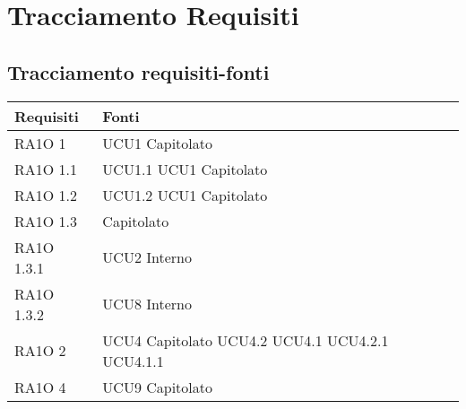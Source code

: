 \section{Tracciamento Requisiti}
\subsection{Tracciamento requisiti-fonti}
      \begin{center}
      \bgroup
      \def\arraystretch{1.8}
      \begin{longtable}{ | p{5cm} | p{5cm} |}
    
      \cellcolor[gray]{0.9} \textbf{Requisiti} & \cellcolor[gray]{0.9} \textbf{Fonti} \\ \hline       
        RA1O 1 &  UCU1 \newline  Capitolato \newline  \\ \hline      
        RA1O 1.1 &  UCU1.1 \newline  UCU1 \newline  Capitolato \newline  \\ \hline      
        RA1O 1.2 &  UCU1.2 \newline  UCU1 \newline  Capitolato \newline  \\ \hline      
        RA1O 1.3  &  Capitolato \newline  \\ \hline      
        RA1O 1.3.1 &  UCU2 \newline  Interno \newline  \\ \hline      
        RA1O 1.3.2 &  UCU8 \newline  Interno \newline  \\ \hline      
        RA1O 2  &  UCU4 \newline  Capitolato \newline  UCU4.2 \newline  UCU4.1 \newline  UCU4.2.1 \newline  UCU4.1.1 \newline  \\ \hline      
        RA1O 4 &  UCU9 \newline  Capitolato \newline  \\ \hline      

\end{longtable}
\end{center}
